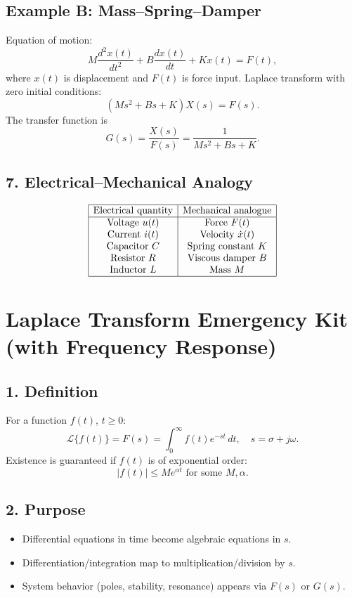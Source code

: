 \documentclass[12pt,a4paper]{article}
\begin{document}
	\subsection*{Example B: Mass–Spring–Damper}
	Equation of motion:
	$$
	M \frac{d^2 x(t)}{dt^2} + B \frac{dx(t)}{dt} + Kx(t) = F(t),
	$$
	where $x(t)$ is displacement and $F(t)$ is force input.  
	Laplace transform with zero initial conditions:
	$$
	(Ms^2 + Bs + K) X(s) = F(s).
	$$
	The transfer function is
	$$
	G(s) = \frac{X(s)}{F(s)} = \frac{1}{Ms^2 + Bs + K}.
	$$
	
	\subsection*{7. Electrical–Mechanical Analogy}
	\[
	\begin{array}{|c|c|}
		\hline
		\text{Electrical quantity} & \text{Mechanical analogue} \\
		\hline
		\text{Voltage } u(t) & \text{Force } F(t) \\
		\text{Current } i(t) & \text{Velocity } \dot{x}(t) \\
		\text{Capacitor } C & \text{Spring constant } K \\
		\text{Resistor } R & \text{Viscous damper } B \\
		\text{Inductor } L & \text{Mass } M \\
		\hline
	\end{array}
	\]
	
	\section*{Laplace Transform Emergency Kit (with Frequency Response)}
	
	\subsection*{1. Definition}
	For a function $f(t)$, $t \ge 0$:
	$$
	\mathcal{L}\{f(t)\} = F(s) = \int_{0}^{\infty} f(t) e^{-st}\,dt, \quad s = \sigma + j\omega.
	$$
	Existence is guaranteed if $f(t)$ is of exponential order:
	$$
	|f(t)| \le M e^{\alpha t} \text{ for some } M,\alpha.
	$$
	
	\subsection*{2. Purpose}
	\begin{itemize}
		\item Differential equations in time become algebraic equations in $s$.
		\item Differentiation/integration map to multiplication/division by $s$.
		\item System behavior (poles, stability, resonance) appears via $F(s)$ or $G(s)$.
	\end{itemize}
	
\end{document}
